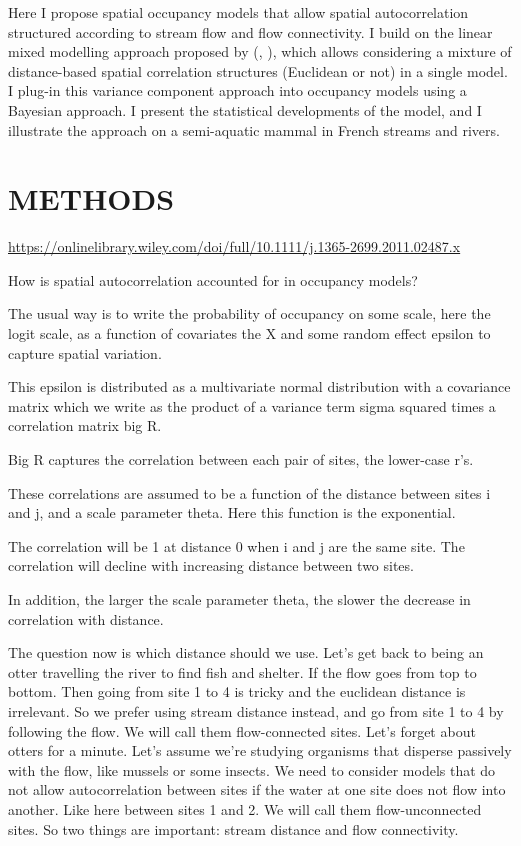 \documentclass[
  11pt,
  a4paper,
]{article}
\begin{document}
Here I propose spatial occupancy models that allow spatial autocorrelation structured according to stream flow and flow connectivity. I build on the linear mixed modelling approach proposed by (, ), which allows considering a mixture of distance-based spatial correlation structures (Euclidean or not) in a single model. I plug-in this variance component approach into occupancy models using a Bayesian approach. I present the statistical developments of the model, and I illustrate the approach on a semi-aquatic mammal in French streams and rivers.

\section{METHODS}\label{methods}

\url{https://onlinelibrary.wiley.com/doi/full/10.1111/j.1365-2699.2011.02487.x}

How is spatial autocorrelation accounted for in occupancy models?

The usual way is to write the probability of occupancy on some scale, here the logit scale, as a function of covariates the X and some random effect epsilon to capture spatial variation.

This epsilon is distributed as a multivariate normal distribution with a covariance matrix which we write as the product of a variance term sigma squared times a correlation matrix big R.

Big R captures the correlation between each pair of sites, the lower-case r's.

These correlations are assumed to be a function of the distance between sites i and j, and a scale parameter theta. Here this function is the exponential.

The correlation will be 1 at distance 0 when i and j are the same site. The correlation will decline with increasing distance between two sites.

In addition, the larger the scale parameter theta,
the slower the decrease in correlation with distance.

The question now is which distance should we use. Let's get back to being an otter travelling the river to find fish and shelter. If the flow goes from top to bottom. Then going from site 1 to 4 is tricky and the euclidean distance is irrelevant. So we prefer using stream distance instead, and go from site 1 to 4 by following the flow. We will call them flow-connected sites. Let's forget about otters for a minute. Let's assume we're studying organisms that disperse passively with the flow, like mussels or some insects.
We need to consider models that do not allow autocorrelation between sites if the water at one site does not flow into another. Like here between sites 1 and 2. We will call them flow-unconnected sites. So two things are important: stream distance and flow connectivity.
\end{document}
